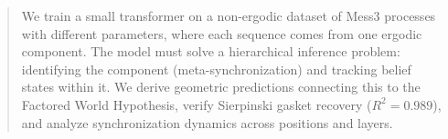 \begin{abstract}
We train a small transformer on a non-ergodic dataset of Mess3 processes with different parameters, where each sequence comes from one ergodic component. The model must solve a hierarchical inference problem: identifying the component (meta-synchronization) and tracking belief states within it. We derive geometric predictions connecting this to the Factored World Hypothesis, verify Sierpinski gasket recovery ($R^2 = 0.989$), and analyze synchronization dynamics across positions and layers.
\end{abstract}

